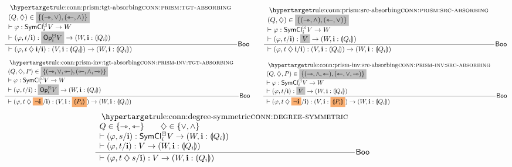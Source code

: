 \documentclass[a4paper]{memoir}
\begin{document}
\begin{figure}
	\[
		\inferencel{conn:prism:tgt-absorbing}{
			(Q, \opA) \in \mathemph{\accol{(\jet, \vee), (\tej, \wedge)}} \\
			\sez \vfi : \UFsymcube_i V \to W \\
			\sez (\vfi, t / \dm i) : \mathemph{\Opcube_i V} \to (W, \dm i : \rival{Q_i})
		}{
			\sez (\vfi, t \opA \dm i / \dm i) : (V, \dm i : \rival{Q_i}) \to (W, \dm i : \rival{Q_i})
		}{$\booleanalg$}
		\qquad
		\inferencel{conn:prism:src-absorbing}{
			(Q, \opA) \in \mathemph{\accol{(\jet, \wedge), (\tej, \vee)}} \\
			\sez \vfi : \UFsymcube_i V \to W \\
			\sez (\vfi, t / \dm i) : \mathemph{V} \to (W, \dm i : \rival{Q_i})
		}{
			\sez (\vfi, t \opA \dm i / \dm i) : (V, \dm i : \rival{Q_i}) \to (W, \dm i : \rival{Q_i})
		}{$\booleanalg$}
	\]
	\[
		\inferencel{conn:prism-inv:tgt-absorbing}{
			(Q, \opA, P) \in \mathemph{\accol{(\jet, \vee, \tej), (\tej, \wedge, \jet)}} \\
			\sez \vfi : \UFsymcube_i V \to W \\
			\sez (\vfi, t / \dm i) : \mathemph{\Opcube_i V} \to (W, \dm i : \rival{Q_i})
		}{
			\sez (\vfi, t \opA \mathemphB{\lnot \dm i} / \dm i) : (V, \dm i : \mathemphB{\rival{P_i}}) \to (W, \dm i : \rival{Q_i})
		}{$\booleanalg$}
		\qquad
		\inferencel{conn:prism-inv:src-absorbing}{
			(Q, \opA, P) \in \mathemph{\accol{(\jet, \wedge, \tej), (\tej, \vee, \jet)}} \\
			\sez \vfi : \UFsymcube_i V \to W \\
			\sez (\vfi, t / \dm i) : \mathemph{V} \to (W, \dm i : \rival{Q_i})
		}{
			\sez (\vfi, t \opA \mathemphB{\lnot \dm i} / \dm i) : (V, \dm i : \mathemphB{\rival{P_i}}) \to (W, \dm i : \rival{Q_i})
		}{$\booleanalg$}
	\]
	\[
		\inferencel{conn:degree-symmetric}{
			Q \in \accol{\jet, \tej} \qquad
			\opA \in \accol{{\vee}, {\wedge}} \\
			\sez (\vfi, s / \dm i) : \UFsymcube_i V \to (W, \dm i : \rival{Q_i}) \\
			\sez (\vfi, t / \dm i) : V \to (W, \dm i : \rival{Q_i})
		}{
			\sez (\vfi, t \opA s / \dm i) : V \to (W, \dm i : \rival{Q_i})
		}{$\booleanalg$}
	\]

\end{figure}
\end{document}
